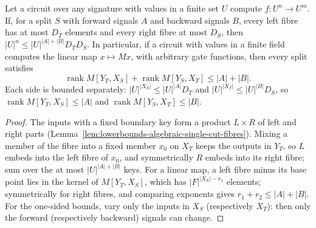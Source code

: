 \begin{theorem}
  \label{thm:lowerbounds-algebraic-rank-cut}
  \leanok
  Let a circuit over any signature with values in a finite set $U$ compute
  $f\colon U^n\to U^m$. If, for a split $S$ with forward signals $A$ and
  backward signals $B$, every left fibre has at most $D_T$ elements and
  every right fibre at most $D_S$, then $|U|^n\le|U|^{|A|+|B|}D_TD_S$. In
  particular, if a circuit with values in a finite field computes the linear
  map $x\mapsto Mx$, with arbitrary gate functions, then every split
  satisfies
  \[
    \operatorname{rank} M[Y_T, X_S] + \operatorname{rank} M[Y_S, X_T]
      \le |A| + |B|.
  \]
  Each side is bounded separately: $|U|^{|X_S|}\le|U|^{|A|}D_T$ and
  $|U|^{|X_T|}\le|U|^{|B|}D_S$, so $\operatorname{rank} M[Y_T,X_S]\le|A|$
  and $\operatorname{rank} M[Y_S,X_T]\le|B|$.
\end{theorem}
\begin{proof}
  \leanok
  The inputs with a fixed boundary key form a product $L\times R$ of left
  and right parts (Lemma~\ref{lem:lowerbounds-algebraic-single-cut-fibres}).
  Mixing a member of the fibre into a fixed member $x_0$ on $X_T$ keeps the
  outputs in $Y_T$, so $L$ embeds into the left fibre of $x_0$, and
  symmetrically $R$ embeds into its right fibre; sum over the at most
  $|U|^{|A|+|B|}$ keys. For a linear map, a left fibre minus its base point
  lies in the kernel of $M[Y_T,X_S]$, which has $|F|^{|X_S|-r_1}$ elements;
  symmetrically for right fibres, and comparing exponents gives
  $r_1+r_2\le|A|+|B|$. For the one-sided bounds, vary only the inputs in
  $X_S$ (respectively $X_T$): then only the forward (respectively backward)
  signals can change.
\end{proof}

